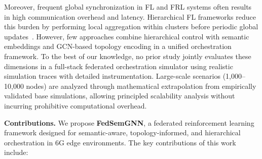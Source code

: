 Moreover, frequent global synchronization in FL and FRL systems often results in high communication overhead and latency. Hierarchical FL frameworks reduce this burden by performing local aggregation within clusters before periodic global updates~\cite{Ma2024_HierarchicalFL}. However, few approaches combine hierarchical control with semantic embeddings and GCN-based topology encoding in a unified orchestration framework. To the best of our knowledge, no prior study jointly evaluates these dimensions in a full-stack federated orchestration simulator using realistic simulation traces with detailed instrumentation. Large-scale scenarios (1,000–10,000 nodes) are analyzed through mathematical extrapolation from empirically validated base simulations, allowing principled scalability analysis without incurring prohibitive computational overhead.

\noindent\textbf{Contributions.} We propose \textbf{FedSemGNN}, a federated reinforcement learning framework designed for semantic-aware, topology-informed, and hierarchical orchestration in 6G edge environments. The key contributions of this work include:

